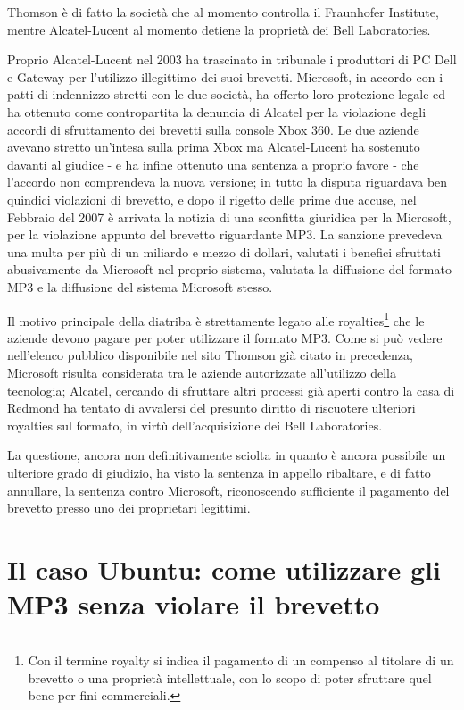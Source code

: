 Thomson è di fatto la società che al momento controlla il Fraunhofer Institute, mentre Alcatel-Lucent al momento detiene la proprietà dei Bell Laboratories.

Proprio Alcatel-Lucent nel 2003 ha trascinato in tribunale i produttori di PC Dell e Gateway per l'utilizzo illegittimo dei suoi brevetti. Microsoft, in accordo con i patti di indennizzo stretti con le due società, ha offerto loro protezione legale ed ha ottenuto come contropartita la denuncia di Alcatel per la violazione degli accordi di sfruttamento dei brevetti sulla console Xbox 360. Le due aziende avevano stretto un'intesa sulla prima Xbox ma Alcatel-Lucent ha sostenuto davanti al giudice - e ha infine ottenuto una sentenza a proprio favore - che l'accordo non comprendeva la nuova versione; in tutto la disputa riguardava ben quindici violazioni di brevetto, e dopo il rigetto delle prime due accuse, nel Febbraio del 2007 è arrivata la notizia di una sconfitta giuridica per la Microsoft, per la violazione appunto del brevetto riguardante MP3. La sanzione prevedeva una multa per più di un miliardo e mezzo di dollari, valutati i benefici sfruttati abusivamente da Microsoft nel proprio sistema, valutata la diffusione del formato MP3 e la diffusione del sistema Microsoft stesso.

Il motivo principale della diatriba è strettamente legato alle royalties\footnote{Con il termine royalty si indica il pagamento di un compenso al titolare di un brevetto o una proprietà intellettuale, con lo scopo di poter sfruttare quel bene per fini commerciali.} che le aziende devono pagare per poter utilizzare il formato MP3. Come si può vedere nell'elenco pubblico disponibile nel sito Thomson già citato in precedenza, Microsoft risulta considerata tra le aziende autorizzate all'utilizzo della tecnologia; Alcatel, cercando di sfruttare altri processi già aperti contro la casa di Redmond ha tentato di avvalersi del presunto diritto di riscuotere ulteriori royalties sul formato, in virtù dell'acquisizione dei Bell Laboratories.

La questione, ancora non definitivamente sciolta in quanto è ancora possibile un ulteriore grado di giudizio, ha visto la sentenza in appello ribaltare, e di fatto annullare, la sentenza contro Microsoft, riconoscendo sufficiente il pagamento del brevetto presso uno dei proprietari legittimi.

 
\section{Il caso Ubuntu: come utilizzare gli MP3 senza violare il brevetto}

